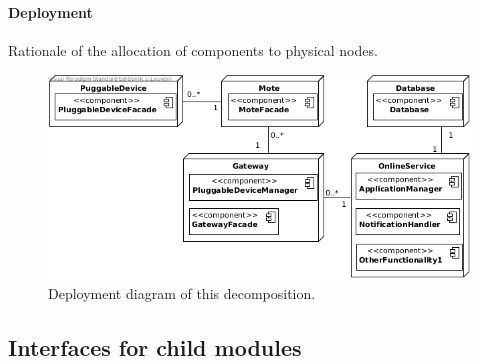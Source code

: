     \paragraph{Deployment}
        Rationale of the allocation of components to physical nodes.

        \begin{figure}[!htp]
        	\centering
        	\includegraphics[width=1.00\textwidth]{deployment-diagram-1}
        	\caption{Deployment diagram of this decomposition.
        	}\label{fig:it1-depl_main}
        \end{figure}


\subsection{Interfaces for child modules}
